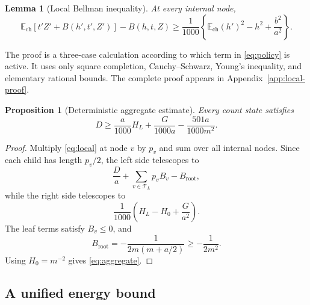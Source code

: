 \documentclass[11pt]{article}
\numberwithin{equation}{section}
\newtheorem{proposition}[theorem]{Proposition}
\newtheorem{lemma}[theorem]{Lemma}
\theoremstyle{remark}
\newcommand{\E}{\mathbb E}
\newcommand{\T}{\mathcal T}
\begin{document}
\begin{lemma}[Local Bellman inequality]\label{lem:local}
At every internal node,
\begin{equation}\label{eq:local}
\E_{\mathrm{ch}}[t'Z'+B(h',t',Z')]-B(h,t,Z)
\ge\frac1{1000}\left\{
\E_{\mathrm{ch}}(h')^2-h^2+\frac{b^2}{a^2}
\right\}.
\end{equation}
\end{lemma}

The proof is a three-case calculation according to which term in
\eqref{eq:policy} is active. It uses only square completion,
Cauchy--Schwarz, Young's inequality, and elementary rational bounds. The
complete proof appears in Appendix~\ref{app:local-proof}.

\begin{proposition}[Deterministic aggregate estimate]\label{prop:aggregate}
Every count state satisfies
\begin{equation}\label{eq:aggregate}
D\ge
\frac a{1000}H_L+\frac{G}{1000a}
-\frac{501a}{1000m^2}.
\end{equation}
\end{proposition}
\begin{proof}
Multiply \eqref{eq:local} at node \(v\) by \(p_v\) and sum over all
internal nodes. Since each child has length \(p_v/2\), the left side
telescopes to
\[
\frac Da+\sum_{v\in\T_L}p_vB_v-B_{\mathrm{root}},
\]
while the right side telescopes to
\[
\frac1{1000}\left(H_L-H_0+\frac{G}{a^2}\right).
\]
The leaf terms satisfy \(B_v\le0\), and
\[
B_{\mathrm{root}}
=-\frac1{2m(m+a/2)}\ge-\frac1{2m^2}.
\]
Using \(H_0=m^{-2}\) gives \eqref{eq:aggregate}.
\end{proof}


\subsection{A unified energy bound}
\end{document}

